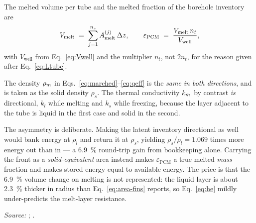 The melted volume per tube and the melted fraction of the borehole inventory are
\begin{equation}
  V_{\mathrm{melt}} \;=\; \sum_{j=1}^{n_{s}} A_{\mathrm{melt}}^{(j)}\,\Delta z,
  \qquad
  \varepsilon_{\mathrm{PCM}}
  \;=\;
  \frac{V_{\mathrm{melt}}\, n_{t}}{V_{\mathrm{well}}},
  \label{eq:eps}
\end{equation}
with $V_{\mathrm{well}}$ from Eq.~\eqref{eq:Vwell} and the multiplier $n_{t}$,
not $2n_{t}$, for the reason given after Eq.~\eqref{eq:Ltube}.

The density $\rho_{m}$ in Eqs.~\eqref{eq:marched}--\eqref{eq:qeff} is the
\emph{same in both directions}, and is taken as the solid density $\rho_{s}$.
The thermal conductivity $k_{m}$ by contrast \emph{is} directional, $k_{l}$ while
melting and $k_{s}$ while freezing, because the layer adjacent to the tube is
liquid in the first case and solid in the second.

The asymmetry is deliberate. Making the latent inventory directional as well
would bank energy at $\rho_{l}$ and return it at $\rho_{s}$, yielding
$\rho_{s}/\rho_{l}=1.069$ times more energy out than in --- a \SI{6.9}{\percent}
round-trip gain from bookkeeping alone. Carrying the front as a
\emph{solid-equivalent} area instead makes $\varepsilon_{\mathrm{PCM}}$ a true
melted \emph{mass} fraction and makes stored energy equal to available energy.
The price is that the \SI{6.9}{\percent} volume change on melting is not
represented: the liquid layer is about \SI{2.3}{\percent} thicker in radius than
Eq.~\eqref{eq:area-fins} reports, so Eq.~\eqref{eq:he} mildly under-predicts the
melt-layer resistance.

\emph{Source:} ; .
